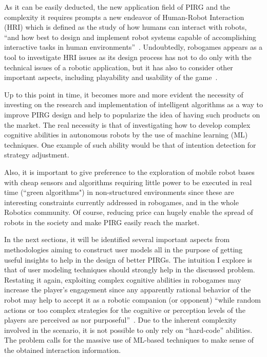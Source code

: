 As it can be easily deducted, the new application field of PIRG and the complexity it requires prompts a new endeavor of Human-Robot Interaction (HRI) which is defined as the study of how humans can interact with robots, ``and how best to design and implement robot systems capable of accomplishing interactive tasks in human environments''~\cite{Feil-Seifer2009}. Undoubtedly, robogames appears as a tool to investigate HRI issues as its design process has not to do only with the technical issues of a robotic application, but it has also to consider other important aspects, including playability and usability of the game~\cite{martinoia2013physically}.

Up to this point in time, it becomes more and more evident the necessity of investing on the research and implementation of intelligent algorithms as a way to improve PIRG design and help to popularize the idea of having such products on the market. The real necessity is that of investigating how to develop complex cognitive abilities in autonomous robots by the use of machine learning (ML) techniques. One example of such ability would be that of intention detection for strategy adjustment. 

Also, it is important to give preference to the exploration of mobile robot bases with cheap sensors and algorithms requiring little power to be executed in real time (``green algorithms") in non-structured environments since these are interesting constraints currently addressed in robogames, and in the whole Robotics community. Of course, reducing price can hugely enable the spread of robots in the society and make PIRG easily reach the market. 

In the next sections, it will be identified several important aspects from methodologies aiming to construct user models all in the purpose of getting useful insights to help in the design of better PIRGs. The intuition I explore is that of user modeling techniques should strongly help in the discussed problem. Restating it again, exploiting complex cognitive abilities in robogames may increase the player's engagement since any apparently rational behavior of the robot may help to accept it as a robotic companion (or opponent) ``while random actions or too complex strategies for the cognitive or perception levels of the players are perceived as nor purposeful''~\cite{martinoia2013physically}. Due to the inherent complexity involved in the scenario, it is not possible to only rely on ``hard-code'' abilities. The problem calls for the massive use of ML-based techniques to make sense of the obtained interaction information. 


